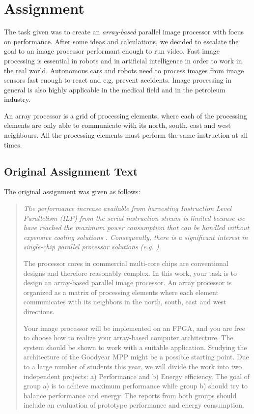 \section{Assignment}
The task given was to create an {\em array-based} parallel image processor with
focus on performance. After some ideas and calculations, we decided to escalate
the goal to an image processor performant enough to run video. Fast image
processing is essential in robots and in artificial intelligence in order to
work in the real world. Autonomous cars and robots need to process images from
image sensors fast enough to react and e.g. prevent accidents. Image processing
in general is also highly applicable in the medical field and in the petroleum
industry.

An array processor is a grid of processing elements, where each of the
processing elements are only able to communicate with its north, south, east and
west neighbours. All the processing elements must perform the same instruction
at all times.


\subsection{Original Assignment Text}

The original assignment was given as follows:

\begin{quotation}\em
The performance increase available from harvesting Instruction Level Parallelism
(ILP) from the serial instruction stream is limited because we have reached the
maximum power consumption that can be handled without expensive cooling
solutions \cite{olukotun2005future}. Consequently, there is a significant
interest in single-chip parallel processor solutions (e.g. \cite{bell2008tile64,
  kongetira2005niagara}).

The processor cores in commercial multi-core chips are conventional designs and
therefore reasonably complex. In this work, your task is to design an
array-based parallel image processor. An array processor is organized as a
matrix of processing elements where each element communicates with its neighbors
in the north, south, east and west directions.

Your image processor will be implemented on an FPGA, and you are free to choose
how to realize your array-based computer architecture. The system should be
shown to work with a suitable application. Studying the architecture of the
Goodyear MPP \cite{batcher1980design,wiki:goodyear} might be a possible starting
point.  Due to a large number of students this year, we will divide the work
into two independent projects: a) Performance and b) Energy efficiency. The goal
of group a) is to achieve maximum performance while group b) should try to
balance performance and energy. The reports from both groups should include an
evaluation of prototype performance and energy consumption.
\end{quotation}

